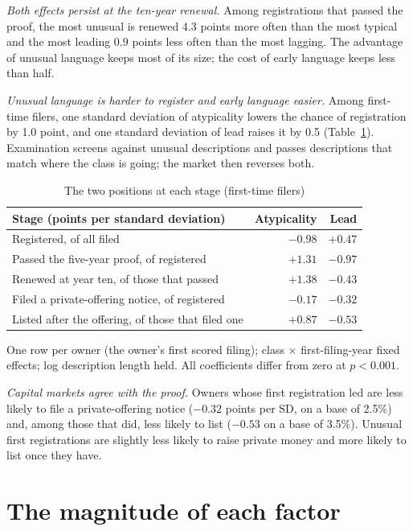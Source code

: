 \emph{Both effects persist at the ten-year renewal.} Among registrations
that passed the proof, the most unusual is renewed 4.3 points more often
than the most typical and the most leading 0.9 points less often than
the most lagging. The advantage of unusual language keeps most of its
size; the cost of early language keeps less than half.

\emph{Unusual language is harder to register and early language easier.}
Among first-time filers, one standard deviation of atypicality lowers the
chance of registration by 1.0 point, and one standard deviation of lead
raises it by 0.5 (Table~\ref{tab:stages}). Examination screens against
unusual descriptions and passes descriptions that match where the class
is going; the market then reverses both.

\begin{table}[htbp]\centering\small
\caption{The two positions at each stage (first-time filers)}\label{tab:stages}
\begin{tabular}{lrr}
\toprule
Stage (points per standard deviation) & Atypicality & Lead \\
\midrule
Registered, of all filed & $-0.98$ & $+0.47$ \\
Passed the five-year proof, of registered & $+1.31$ & $-0.97$ \\
Renewed at year ten, of those that passed & $+1.38$ & $-0.43$ \\
Filed a private-offering notice, of registered & $-0.17$ & $-0.32$ \\
Listed after the offering, of those that filed one & $+0.87$ & $-0.53$ \\
\bottomrule
\end{tabular}
\par\footnotesize One row per owner (the owner's first scored filing);
class $\times$ first-filing-year fixed effects; log description length
held. All coefficients differ from zero at $p<0.001$.
\end{table}

\emph{Capital markets agree with the proof.} Owners whose first
registration led are less likely to file a private-offering notice
($-0.32$ points per SD, on a base of 2.5\%) and, among those that did,
less likely to list ($-0.53$ on a base of 3.5\%). Unusual first
registrations are slightly less likely to raise private money and more
likely to list once they have.

\section{The magnitude of each factor}\label{sec:magnitudes}

